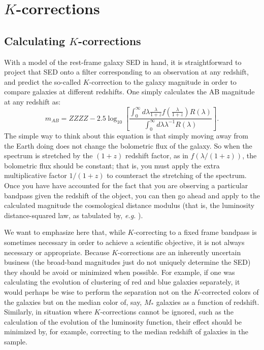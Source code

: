 \documentclass[10pt,preprint]{aastex}
\begin{document}
\section{$K$-corrections}
\label{kcorrection}

\subsection{Calculating $K$-corrections}

With a model of the rest-frame galaxy SED in hand, it is 
straightforward to project that SED onto a filter corresponding to 
an observation at any redshift, and predict the so-called
$K$-correction to the galaxy magnitude in order to compare galaxies 
at different redshifts. One simply calculates the AB magnitude at 
any redshift as:
\begin{equation}
m_{AB} = ZZZZ - 2.5 \log_{10}\left[
\frac{\int_{0}^{\infty} d\lambda \frac{\lambda}{1+z}
f(\frac{\lambda}{1+z}) R(\lambda)}
{\int_{0}^{\infty} d\lambda \lambda^{-1} R(\lambda)}\right].
\end{equation}
The simple way to think about this equation is that simply moving away
from the Earth doing does not change the bolometric flux of the
galaxy. So when the spectrum is stretched by the $(1+z)$ redshift
factor, as in $f(\lambda/(1+z))$, the bolometric flux should be
constant; that is, you must apply the extra multiplicative factor
$1/(1+z)$ to counteract the stretching of the spectrum. Once you have
have accounted for the fact that you are observing a particular
bandpass given the redshift of the object, you can then go ahead and
apply to the calculated magnitude the cosmological distance modulus
(that is, the luminosity distance-squared law, as tabulated by, {\it
e.g.} \citealt{hogg97a}).

We want to emphasize here that, while $K$-correcting to a fixed frame
bandpass is sometimes necessary in order to achieve a scientific
objective, it is not always necessary or appropriate. Because
$K$-corrections are an inherently uncertain business (the broad-band
magnitudes just do not uniquely determine the SED) they should be
avoid or minimized when possible. For example, if one was calculating
the evolution of clustering of red and blue galaxies separately, it
would perhaps be wise to perform the separation not on the
$K$-corrected colors of the galaxies but on the median color of, say,
$M_\ast$ galaxies as a function of redshift. Similarly, in situation
where $K$-corrections cannot be ignored, such as the calculation of
the evolution of the luminosity function, their effect should be
minimized by, for example, correcting to the median redshift of
galaxies in the sample.
\end{document}
